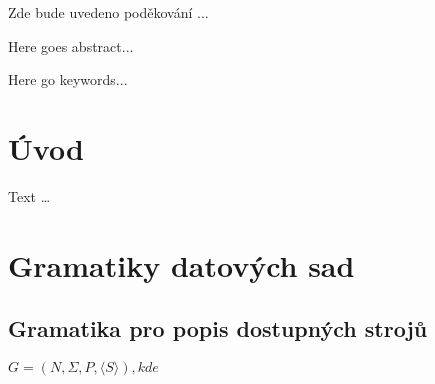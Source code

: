 \documentclass[draft]{fithesis}
\begin{document}
\FrontMatter
\ThesisTitlePage

\begin{ThesisDeclaration}
\DeclarationText
\AdvisorName
\end{ThesisDeclaration}

\begin{ThesisThanks}
Zde bude uvedeno poděkování ...
\end{ThesisThanks}

\begin{ThesisAbstract}
Here goes abstract...
\end{ThesisAbstract}

\begin{ThesisKeyWords}
Here go keywords...
\end{ThesisKeyWords}

\tableofcontents
\MainMatter

\chapter{Úvod}
Text \ldots




\appendix 

\chapter{Gramatiky datových sad}

\section{Gramatika pro popis dostupných strojů}

$G = (N, \Sigma, P,  \langle S  \rangle ), kde$
\end{document}
